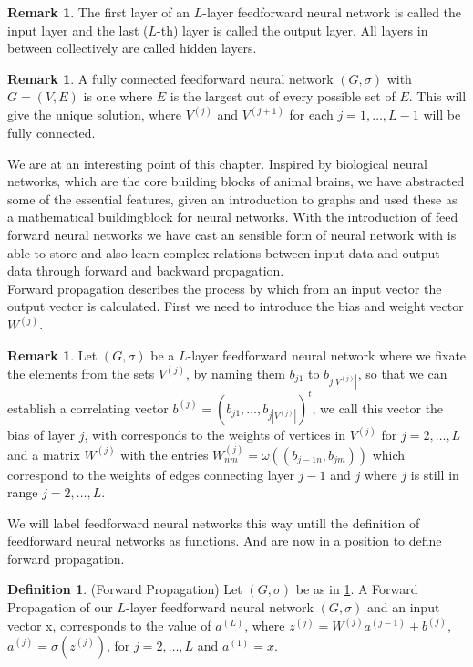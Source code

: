 \documentclass{article}
\theoremstyle{definition}
\newtheorem{definition}[theorem]{Definition}
\newtheorem{remark}[theorem]{Remark}
\begin{document}
\begin{remark}
The first layer of an $L$-layer feedforward neural network is called the input layer and the last ($L$-th) layer is called the output layer. All layers in between collectively are called hidden layers.
\end{remark}

\begin{remark}
A fully connected feedforward neural network $(G, \sigma)$ with $G = (V, E)$ is one where $E$ is the largest out of every possible set of $E$. This will give the unique solution, where $V^{(j)}$ and $V^{(j+1)}$ for each $j = 1, \dots , L-1$ will be fully connected.
\end{remark}

We are at an interesting point of this chapter. Inspired by biological neural networks, which are the core building blocks of animal brains, we have abstracted some of the essential features, given an introduction to graphs and used these as a mathematical buildingblock for neural networks.
With the introduction of feed forward neural networks we have cast an sensible form of neural network with is able to store and also learn complex relations between input data and output data through forward and backward propagation. \\
Forward propagation describes the process by which from an input vector the output vector is calculated. First we need to introduce the bias and weight vector $W^{(j)}$.

\begin{remark}\label{standardGraphLabeling}
Let $(G, \sigma)$ be a $L$-layer feedforward neural network where we fixate the elements from the sets $V^{(j)}$, by naming them $b_{j1}$ to $b_{j|V^{(j)}|}$, so that we can establish a correlating vector $b^{(j)} = (b_{j1}, \dots ,b_{j|V^{(j)}|})^{t}$, we call this vector the bias of layer $j$, with corresponds to the weights of vertices in $V^{(j)}$ for $j = 2, \dots , L$ and a matrix $W^{(j)}$ with the entries $W^{(j)}_{nm} = \omega((b_{j-1n}, b_{jm}))$ which correspond to the weights of edges connecting layer $j-1$ and $j$ where $j$ is still in range $j = 2, \dots , L$.
\end{remark}

We will label feedforward neural networks this way untill the definition of feedforward neural networks as functions. And are now in a position to define forward propagation.

\begin{definition}(Forward Propagation)
Let $(G, \sigma)$ be as in \ref{standardGraphLabeling}. A Forward Propagation of our $L$-layer feedforward neural network $(G, \sigma)$ and an input vector x, corresponds to the value of $a^{(L)}$, where $z^{(j)} = W^{(j)} a^{(j-1)} + b^{(j)}$, $a^{(j)} = \sigma(z^{(j)})$, for $j=2, \dots , L$ and $a^{(1)} = x$.
\end{definition}
\end{document}
